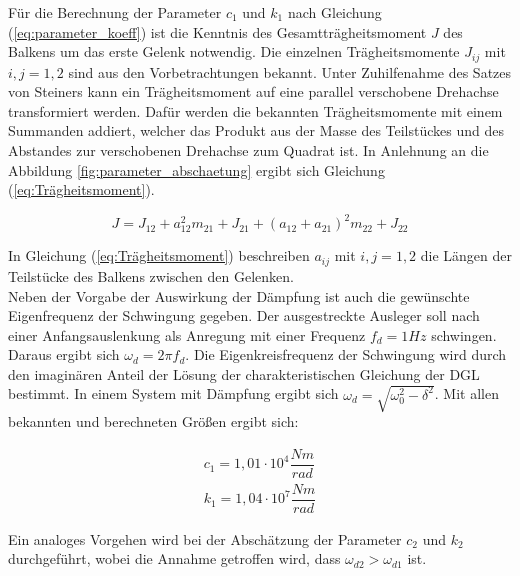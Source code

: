 Für die Berechnung der Parameter $c_1$ und $k_1$ nach Gleichung (\ref{eq:parameter_koeff}) ist die Kenntnis des Gesamtträgheitsmoment $J$ des Balkens um das erste Gelenk notwendig. Die einzelnen Trägheitsmomente $J_{ij}$ mit $i,j=1,2$ sind aus den Vorbetrachtungen bekannt. Unter Zuhilfenahme des Satzes von Steiners kann ein Trägheitsmoment auf eine parallel verschobene Drehachse transformiert werden. Dafür werden die bekannten Trägheitsmomente mit einem Summanden addiert, welcher das Produkt aus der Masse des Teilstückes und des Abstandes zur verschobenen Drehachse zum Quadrat ist. In Anlehnung an die Abbildung \ref{fig:parameter_abschaetung} ergibt sich Gleichung (\ref{eq:Trägheitsmoment}).

\begin{equation} \label{eq:Trägheitsmoment}
J=J_{12}+a_{12}^2m_{21} + J_{ 21} + (a_{12}+a_{21})^2m_{22}+J_{22}
\end{equation}

In Gleichung (\ref{eq:Trägheitsmoment}) beschreiben $a_{ij}$ mit $i,j=1,2$ die Längen der Teilstücke des Balkens zwischen den Gelenken.\\
Neben der Vorgabe der Auswirkung der Dämpfung ist auch die gewünschte Eigenfrequenz der Schwingung gegeben. Der ausgestreckte Ausleger soll nach einer Anfangsauslenkung als Anregung mit einer Frequenz $f_d=1\si{Hz}$ schwingen. Daraus ergibt sich $\omega_d=2\pi f_d$. Die Eigenkreisfrequenz der Schwingung wird durch den imaginären Anteil der Lösung der charakteristischen Gleichung der DGL bestimmt. In einem System mit Dämpfung ergibt sich $\omega_d=\sqrt{\omega_0^2-\delta^2}$.
Mit allen bekannten und berechneten Größen ergibt sich:

\begin{subequations} \label{eq:c1k1}
\begin{align}
c_1=1,01\cdot 10^4 \dfrac{\si{Nm}}{\si{rad}} \\
k_1=1,04\cdot 10^7 \dfrac{\si{Nm}}{\si{rad}}
\end{align}
\end{subequations}

Ein analoges Vorgehen wird bei der Abschätzung der Parameter $c_2$ und $k_2$ durchgeführt, wobei die Annahme getroffen wird, dass $\omega_{d2}>\omega_{d1}$ ist.